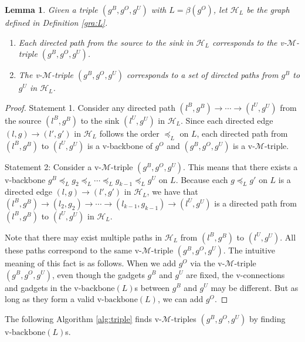 \documentclass[11pt]{article}
\newcommand{\HH}{\mathcal{H}}
\newcommand{\MM}{\mathcal{M}}
\newtheorem{lemma}[figure]{Lemma}
\begin{document}
\begin{lemma}\label{lemma:feasibility}
Given a triple $(g^B, g^O, g^U)$ with $L=\beta(g^O)$, let $\HH_L$ be the graph
defined in Definition \ref{gra:L}.

\begin{enumerate}
\item Each directed path from the source to the sink
in $\HH_L$ corresponds to the v-$\MM$-triple $(g^B, g^O, g^U)$.





\item The v-$\MM$-triple $(g^B, g^O, g^U)$ corresponds to a set of
directed paths from $g^B$ to $g^U$ in $\HH_L$.

\end{enumerate}
\end{lemma}

\begin{proof}
Statement 1.
Consider any directed path $(l^B, g^B) \rightarrow \cdots
\rightarrow (l^U, g^U)$ from the source $(l^B, g^B)$ to the sink
$(l^U, g^U)$ in $\HH_L$.
Since each directed edge $(l, g)\rightarrow (l', g')$ in $\HH_L$
follows the order $\preceq_L$ on $L$,
each directed path from $(l^B, g^B)$ to $(l^U, g^U)$ is a v-backbone of $g^O$
and $(g^B,g^O,g^U)$ is a v-$\MM$-triple.

Statement 2: Consider a v-$\MM$-triple $(g^B,g^O,g^U)$. This means
that there exists a v-backbone
$g^B\preceq_L g_2 \preceq_L \cdots \preceq_L g_{k-1}\preceq_L g^U$ on $L$.
Because each $g\preceq_L g'$ on $L$ is a directed edge $(l, g)\rightarrow (l', g')$
in $\HH_L$,
we have that
$(l^B, g^B)\rightarrow (l_2, g_2) \rightarrow \cdots \rightarrow (l_{k-1}, g_{k-1}) \rightarrow (l^U, g^U)$
is a directed path from $(l^B, g^B)$ to $(l^U, g^U)$ in $\HH_L$.

Note that there may exist multiple paths in $\HH_L$ from $(l^B, g^B)$ to
$(l^U, g^U)$. All these paths correspond to the same v-$\MM$-triple
$(g^B,g^O,g^U)$. The intuitive meaning of this fact is as follows.
When we add $g^O$ via the v-$\MM$-triple $(g^B,g^O,g^U)$, even though
the gadgets $g^B$ and $g^U$ are fixed, the v-connections and gadgets in the
$\mbox{v-backbone}(L)$s between $g^B$ and $g^U$
may be different. But as long as they form a valid
$\mbox{v-backbone}(L)$, we can add $g^O$.
\end{proof}


The following Algorithm \ref{alg:triple}  finds
v-$\MM$-triples $(g^B, g^O, g^U)$ by finding $\mbox{v-backbone}(L)$s.
\end{document}
